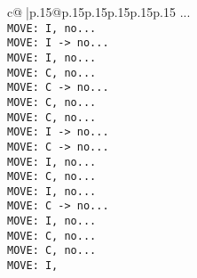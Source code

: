 \documentclass{article}
\begin{document}
{\begin{supertabular}{c@{$\;$}|p{.15\linewidth}@{}p{.15\linewidth}p{.15\linewidth}p{.15\linewidth}p{.15\linewidth}p{.15\linewidth}}
{{{...\\ \tt  MOVE: I, no...\\ \tt  MOVE: I -> no...\\ \tt  MOVE: I, no...\\ \tt  MOVE: C, no...\\ \tt  MOVE: C -> no...\\ \tt  MOVE: C, no...\\ \tt  MOVE: C, no...\\ \tt  MOVE: I -> no...\\ \tt  MOVE: C -> no...\\ \tt  MOVE: I, no...\\ \tt  MOVE: C, no...\\ \tt  MOVE: I, no...\\ \tt  MOVE: C -> no...\\ \tt  MOVE: I, no...\\ \tt  MOVE: C, no...\\ \tt  MOVE: C, no...\\ \tt  MOVE: I,}}}
\end{supertabular}}
\end{document}
